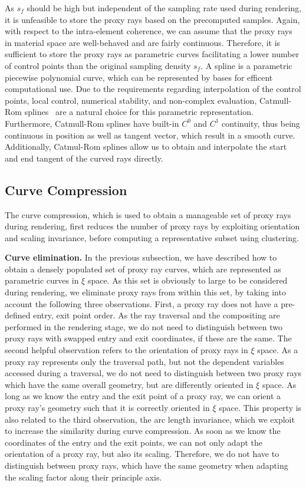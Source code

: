 \documentclass[review,journal]{vgtc}         %
\begin{document}
As $s_f$ should be high but independent of the sampling rate used during rendering, it is unfeasible to store the proxy rays based on the precomputed samples. Again, with respect to the intra-element coherence, we can assume that the proxy rays in material space are well-behaved and are fairly continuous. Therefore, it is sufficient to store the proxy rays as parametric curves facilitating a lower number of control points than the original sampling density $s_f$. A spline is a parametric piecewise polynomial curve, which can be represented by bases for efficent computational use. Due to the requirements regarding interpolation of the control points, local control, numerical stability, and non-complex evaluation, Catmull-Rom splines~\cite{catmull74splines} are a natural choice for this parametric representation. Furthermore, Catmull-Rom splines have built-in $C^{0}$ and $C^{1}$ continuity, thus being continuous in position as well as tangent vector, which result in a smooth curve. Additionally, Catmul-Rom splines allow us to obtain and interpolate the start and end tangent of the curved rays directly.

\subsection{Curve Compression}\label{subsec:curvecompression}

The curve compression, which is used to obtain a manageable set of proxy rays during rendering, first reduces the number of proxy rays by exploiting orientation and scaling invariance, before computing a representative subset using clustering.

\noindent \textbf{Curve elimination.} In the previous subsection, we have described how to obtain a densely populated set of proxy ray curves, which are represented as parametric curves in $\xi$ space. As this set is obviously to large to be considered during rendering, we eliminate proxy rays from within this set, by taking into account the following three observations. First, a proxy ray does not have a pre-defined entry, exit point order. As the ray traversal and the compositing are performed in the rendering stage, we do not need to distinguish between two proxy rays with swapped entry and exit coordinates, if these are the same. The second helpful observation refers to the orientation of proxy rays in $\xi$ space. As a proxy ray represents only the traversal path, but not the dependent variables accessed during a traversal, we do not need to distinguish between two proxy rays which have the same overall geometry, but are differently oriented in $\xi$ space. As long as we know the entry and the exit point of a proxy ray, we can orient a proxy ray's geometry such that it is correctly oriented in $\xi$ space. This property is also related to the third observation, the arc length invariance, which we exploit to increase the similarity during curve compression. As soon as we know the coordinates of the entry and the exit points, we can not only adapt the orientation of a proxy ray, but also its scaling. Therefore, we do not have to distinguish between proxy rays, which have the same geometry when adapting the scaling factor along their principle axis.
\end{document}
